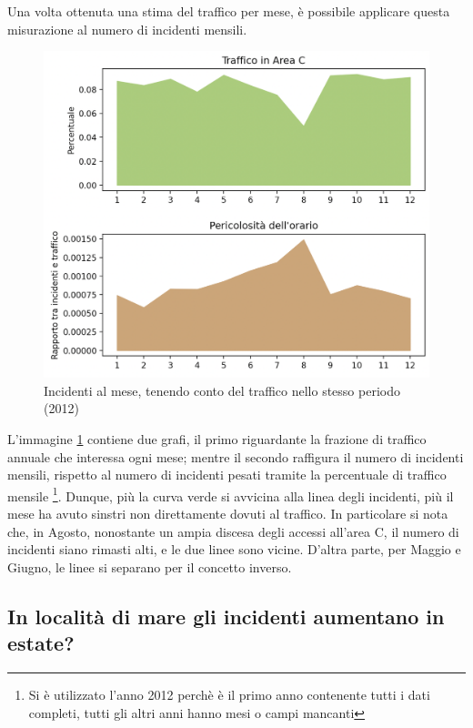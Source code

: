 \documentclass[a4paper]{report}
\begin{document}
Una volta ottenuta una stima del traffico per mese, è possibile applicare questa misurazione 
al numero di incidenti mensili.

\begin{figure}
    \includegraphics[width=\linewidth]{../src/area_c/incidenti_traffico_mese.png}
    \caption{Incidenti al mese, tenendo conto del traffico nello stesso periodo (2012)}
    \label{fig:incidenti-traffico-mese}
\end{figure}

L'immagine \ref{fig:incidenti-traffico-mese} contiene due grafi, 
il primo riguardante la frazione di traffico annuale che interessa ogni mese; 
mentre il secondo raffigura il numero di incidenti mensili, rispetto al numero di incidenti pesati 
tramite la percentuale di traffico mensile
\footnote{Si è utilizzato l'anno 2012 perchè è il primo anno contenente tutti i dati completi, 
tutti gli altri anni hanno mesi o campi mancanti}.
Dunque, più la curva verde si avvicina alla linea degli incidenti, più il mese ha avuto sinstri 
non direttamente dovuti al traffico.
In particolare si nota che, in Agosto, nonostante un ampia discesa degli accessi all'area C, 
il numero di incidenti siano rimasti alti, e le due linee sono vicine.
D'altra parte, per Maggio e Giugno, le linee si separano per il concetto inverso.

\subsection{In località di mare gli incidenti aumentano in estate?}
\end{document}
